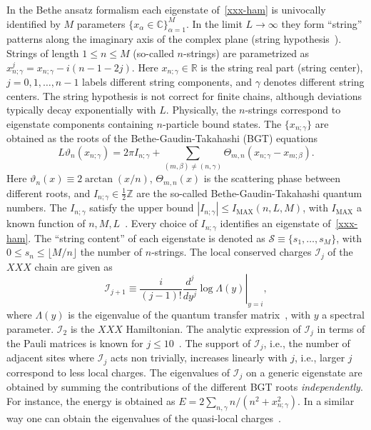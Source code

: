 \documentclass[twocolumn,superscriptaddress,prb,10pt]{revtex4-1}
\begin{document}
In the Bethe ansatz formalism each eigenstate of~\eqref{xxx-ham} is univocally identified 
by $M$ parameters  $\{x_\alpha\in\mathbb{C}\}_{\alpha=1}^M$. In the limit $L\to\infty$ they 
form ``string'' patterns along the imaginary axis of the complex 
plane (string hypothesis~\cite{bethe-1931,taka-book}). Strings of length $1\le n\le M$ 
(so-called $n$-strings) are parametrized as $x_{n;\gamma}^{j}=x_{n;\gamma}-i(n-1-2j)$. 
Here $x_{n;\gamma}\in\mathbb{R}$ is the string real part (string center), $j=0,1,\dots,n-1$ 
labels different string components, and $\gamma$ denotes different string centers. The 
string hypothesis is not correct for finite chains, although deviations typically decay 
exponentially with $L$. Physically, the $n$-strings correspond to eigenstate components 
containing $n$-particle bound states. The $\{x_{n;\gamma}\}$ are obtained as the roots 
of the Bethe-Gaudin-Takahashi (BGT) equations 
%
\begin{equation}
L\vartheta_n(x_{n;\gamma})=2\pi I_{n;\gamma}+\sum\limits_{(m,\beta)
\ne(n,\gamma)}\Theta_{m,n}(x_{n;\gamma}-x_{m;\beta}).
\label{bt-eq}
\end{equation}
%
Here $\vartheta_n(x)\equiv2\arctan(x/n)$, $\Theta_{m,n}(x)$ is the scattering 
phase between different roots, and $I_{n;\gamma}\in\frac{1}{2}\mathbb{Z}$ are the so-called 
Bethe-Gaudin-Takahashi quantum numbers. The $I_{n;\gamma}$ satisfy the upper bound $|I_{n;\gamma}|
\le I_{\textrm{MAX}}(n,L,M)$, with $I_{\textrm{MAX}}$ a known function of $n,M,L$~\cite{taka-book}. 
Every choice of $I_{n;\gamma}$ identifies an eigenstate of~\eqref{xxx-ham}. 
The ``string content'' of each eigenstate is denoted as ${\mathcal S}\equiv\{s_1,\dots,
s_M\}$, with $0\le s_n\le \lfloor M/n\rfloor$ the number of $n$-strings.  
The local conserved charges ${\mathcal I}_j$ of the $XXX$ chain are given as   
%
\begin{equation}
\label{I-def}
\left.{\mathcal I}_{j+1}\equiv\frac{i}{(j-1)!}\frac{d^j}{dy^j}\log\Lambda
(y)\right|_{y=i}, 
\end{equation}
%
where $\Lambda(y)$ is the eigenvalue of the quantum transfer matrix~\cite{kor-book}, 
with $y$ a spectral parameter. ${\mathcal I}_2$ is the $XXX$ Hamiltonian. 
The analytic expression of ${\mathcal I}_j$ in terms of the Pauli matrices is known  
for $j\le 10$~\cite{grabowski-1995}. The support of ${\mathcal I}_j$, i.e., the number of 
adjacent sites where ${\mathcal I}_j$ acts non trivially, increases linearly with $j$, i.e., 
larger $j$ correspond to less local charges.  
The eigenvalues of ${\mathcal I}_j$ on a generic eigenstate are 
obtained by summing the contributions of the different BGT roots {\it independently}. 
For instance, the energy is obtained as $E=2\sum_{n,\gamma} n/(n^2+x^2_{n;\gamma})$. 
In a similar way one can obtain the eigenvalues of the quasi-local charges~\cite{ilievski-2015a}. 
\end{document}
